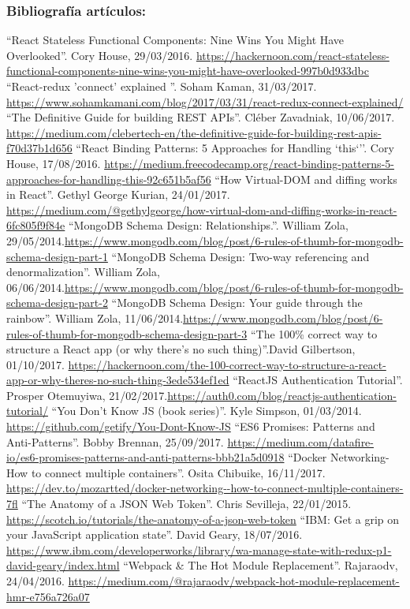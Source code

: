 
\subsubsection*{Bibliografía artículos:}

\bibitem{} ``React Stateless Functional Components: Nine Wins You Might Have Overlooked''. Cory House, 29/03/2016. \url{https://hackernoon.com/react-stateless-functional-components-nine-wins-you-might-have-overlooked-997b0d933dbc}
\bibitem{} ``React-redux 'connect' explained ''. Soham Kaman, 31/03/2017. \url{https://www.sohamkamani.com/blog/2017/03/31/react-redux-connect-explained/}
\bibitem{} ``The Definitive Guide for building REST APIs''. Cléber Zavadniak, 10/06/2017. \url{https://medium.com/clebertech-en/the-definitive-guide-for-building-rest-apis-f70d37b1d656}
\bibitem{} ``React Binding Patterns: 5 Approaches for Handling `this`''. Cory House, 17/08/2016. \url{https://medium.freecodecamp.org/react-binding-patterns-5-approaches-for-handling-this-92c651b5af56}
\bibitem{} ``How Virtual-DOM and diffing works in React''. Gethyl George Kurian, 24/01/2017. \url{https://medium.com/@gethylgeorge/how-virtual-dom-and-diffing-works-in-react-6fc805f9f84e}
\bibitem{} ``MongoDB Schema Design: Relationships.''. William Zola, 29/05/2014.\url{https://www.mongodb.com/blog/post/6-rules-of-thumb-for-mongodb-schema-design-part-1}
\bibitem{} ``MongoDB Schema Design: Two-way referencing and denormalization''. William Zola, 06/06/2014.\url{https://www.mongodb.com/blog/post/6-rules-of-thumb-for-mongodb-schema-design-part-2}
\bibitem{} ``MongoDB Schema Design: Your guide through the rainbow''. William Zola, 11/06/2014.\url{https://www.mongodb.com/blog/post/6-rules-of-thumb-for-mongodb-schema-design-part-3}
\bibitem{} ``The 100\% correct way to structure a React app (or why there’s no such thing)''.David Gilbertson, 01/10/2017. \url{https://hackernoon.com/the-100-correct-way-to-structure-a-react-app-or-why-theres-no-such-thing-3ede534ef1ed}
\bibitem{} ``ReactJS Authentication Tutorial''. Prosper Otemuyiwa, 21/02/2017.\url{https://auth0.com/blog/reactjs-authentication-tutorial/}
\bibitem{} ``You Don't Know JS (book series)''. Kyle Simpson, 01/03/2014. \url{https://github.com/getify/You-Dont-Know-JS}
\bibitem{} ``ES6 Promises: Patterns and Anti-Patterns''. Bobby Brennan, 25/09/2017. \url{https://medium.com/datafire-io/es6-promises-patterns-and-anti-patterns-bbb21a5d0918}
\bibitem{} ``Docker Networking- How to connect multiple containers''. Osita Chibuike, 16/11/2017. \url{https://dev.to/mozartted/docker-networking--how-to-connect-multiple-containers-7fl}
\bibitem{} ``The Anatomy of a JSON Web Token''. Chris Sevilleja, 22/01/2015. \url{https://scotch.io/tutorials/the-anatomy-of-a-json-web-token}
\bibitem{} ``IBM: Get a grip on your JavaScript application state''. David Geary, 18/07/2016. \url{https://www.ibm.com/developerworks/library/wa-manage-state-with-redux-p1-david-geary/index.html}
\bibitem{} ``Webpack & The Hot Module Replacement''. Rajaraodv, 24/04/2016. \url{https://medium.com/@rajaraodv/webpack-hot-module-replacement-hmr-e756a726a07}


